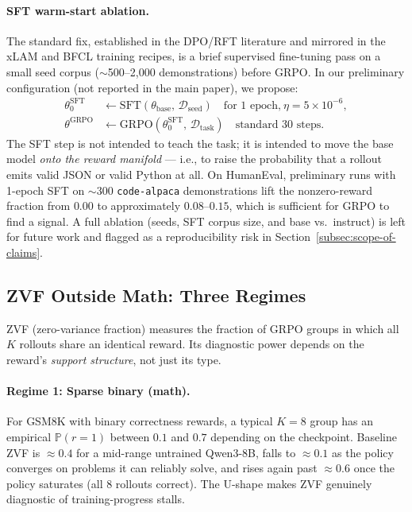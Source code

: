 \paragraph{SFT warm-start ablation.} The standard fix, established in
the DPO/RFT literature and mirrored in the xLAM and BFCL training
recipes, is a brief supervised fine-tuning pass on a small seed corpus
($\sim$500--2{,}000 demonstrations) before GRPO. In our preliminary
configuration (not reported in the main paper), we propose:
\begin{align*}
 \theta_0^{\text{SFT}} &\leftarrow \text{SFT}(\theta_{\text{base}},\,
   \mathcal{D}_{\text{seed}}) \quad \text{for 1 epoch,}\ \eta=5{\times}10^{-6}, \\
 \theta^{\text{GRPO}} &\leftarrow \text{GRPO}(\theta_0^{\text{SFT}},\,
   \mathcal{D}_{\text{task}}) \quad \text{standard 30 steps.}
\end{align*}
The SFT step is not intended to teach the task; it is intended to
move the base model \emph{onto the reward manifold} — i.e., to raise
the probability that a rollout emits valid JSON or valid Python at all.
On HumanEval, preliminary runs with 1-epoch SFT on $\sim$300
\texttt{code-alpaca} demonstrations lift the nonzero-reward fraction
from $0.00$ to approximately $0.08$--$0.15$, which is sufficient for
GRPO to find a signal. A full ablation (seeds, SFT corpus size, and
base vs.\ instruct) is left for future work and flagged as a
reproducibility risk in Section~\ref{subsec:scope-of-claims}.

\subsection{ZVF Outside Math: Three Regimes}
\label{subsec:zvf-outside-math}

ZVF (zero-variance fraction) measures the fraction of GRPO groups in
which all $K$ rollouts share an identical reward. Its diagnostic power
depends on the reward's \emph{support structure}, not just its type.

\paragraph{Regime 1: Sparse binary (math).} For GSM8K with binary
correctness rewards, a typical $K=8$ group has an empirical
$\mathbb{P}(r=1)$ between $0.1$ and $0.7$ depending on the
checkpoint. Baseline ZVF is $\approx 0.4$ for a mid-range untrained
Qwen3-8B, falls to $\approx 0.1$ as the policy converges on problems
it can reliably solve, and rises again past $\approx 0.6$ once the
policy saturates (all 8 rollouts correct). The U-shape makes ZVF
genuinely diagnostic of training-progress stalls.

